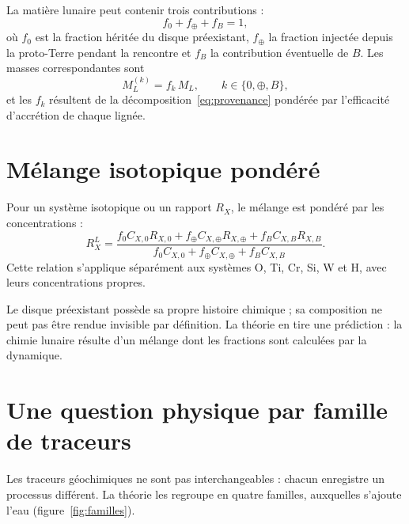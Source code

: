 \documentclass[11pt,a4paper,openany]{report}
\begin{document}
La matière lunaire peut contenir trois contributions :
\begin{equation}
f_0+f_\oplus+f_B=1,
\label{eq:fractions}
\end{equation}
où $f_0$ est la fraction héritée du disque préexistant, $f_\oplus$ la fraction injectée depuis la
proto-Terre pendant la rencontre et $f_B$ la contribution éventuelle de $B$. Les masses
correspondantes sont
\begin{equation}
M_L^{(k)}=f_k\,M_L,\qquad k\in\{0,\oplus,B\},
\label{eq:MLk}
\end{equation}
et les $f_k$ résultent de la décomposition~\eqref{eq:provenance} pondérée par l'efficacité
d'accrétion de chaque lignée.

\section{Mélange isotopique pondéré}

Pour un système isotopique ou un rapport $R_X$, le mélange est pondéré par les concentrations :
\begin{equation}
R_X^L=\frac{f_0C_{X,0}R_{X,0}+f_\oplus C_{X,\oplus}R_{X,\oplus}+f_BC_{X,B}R_{X,B}}
{f_0C_{X,0}+f_\oplus C_{X,\oplus}+f_BC_{X,B}}.
\label{eq:melange}
\end{equation}
Cette relation s'applique séparément aux systèmes O, Ti, Cr, Si, W et H, avec leurs concentrations
propres.

\begin{ideephys}
Le disque préexistant possède sa propre histoire chimique ; sa composition ne peut pas être
rendue invisible par définition. La théorie en tire une prédiction : la chimie lunaire résulte d'un
mélange dont les fractions sont calculées par la dynamique.
\end{ideephys}


\section{Une question physique par famille de traceurs}

Les traceurs géochimiques ne sont pas interchangeables : chacun enregistre un processus
différent. La théorie les regroupe en quatre familles, auxquelles s'ajoute l'eau (figure~\ref{fig:familles}).
\end{document}
